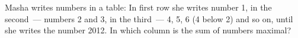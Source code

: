 \problem
Masha writes numbers in a table:
In first row she writes number 1, in the second~--- numbers 2 and 3, in the
third~--- 4, 5, 6 (4 below 2) and so on, until she writes the number 2012.
In which column is the sum of numbers maximal?
\solution
\endproblem
